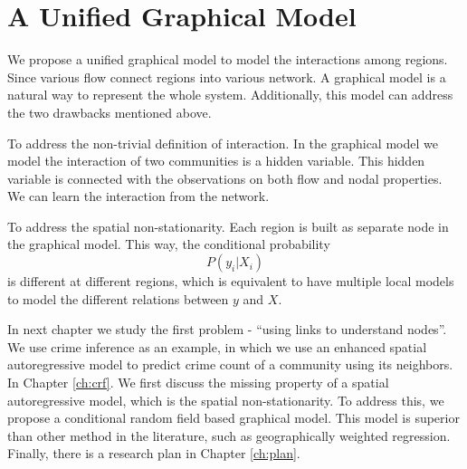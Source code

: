 \section{A Unified Graphical Model}

We propose a unified graphical model to model the interactions among regions. Since various flow connect regions into various network. A graphical model is a natural way to represent the whole system. Additionally, this model can address the two drawbacks mentioned above.

To address the non-trivial definition of interaction. In the graphical model we model the interaction of two communities is a hidden variable. This hidden variable is connected with the observations on both flow and nodal properties. We can learn the interaction from the network.

To address the spatial non-stationarity. Each region is built as separate node in the graphical model. This way, the conditional probability 
\[ P(y_i | X_i) \]
is different at different regions, which is equivalent to have multiple local models to model the different relations between $y$ and $X$.





In next chapter we study the first problem - ``using links to understand nodes''. We use crime inference as an example, in which we use an enhanced spatial autoregressive model to predict crime count of a community using its neighbors. In Chapter \ref{ch:crf}. We first discuss the missing property of a spatial autoregressive model, which is the spatial non-stationarity. To address this, we propose a conditional random field based  graphical model. This model is superior than other method in the literature, such as geographically weighted regression. Finally, there is a research plan in Chapter \ref{ch:plan}.



